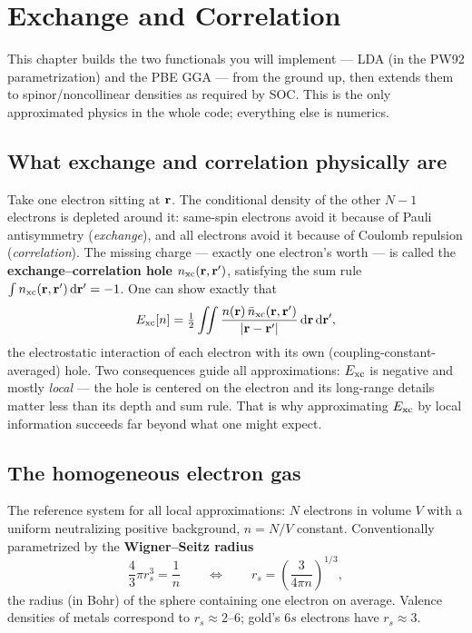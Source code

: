 \chapter{Exchange and Correlation}
\label{ch:xc}

This chapter builds the two functionals you will implement --- LDA (in the
PW92 parametrization) and the PBE GGA --- from the ground up, then extends
them to spinor/noncollinear densities as required by SOC. This is the only
approximated physics in the whole code; everything else is numerics.

\section{What exchange and correlation physically are}

Take one electron sitting at $\mathbf{r}$. The conditional density of the other
$N-1$ electrons is depleted around it: same-spin electrons avoid it because
of Pauli antisymmetry (\emph{exchange}), and all electrons avoid it because
of Coulomb repulsion (\emph{correlation}). The missing charge --- exactly one
electron's worth --- is called the \textbf{exchange--correlation hole}
$n_{\mathrm{xc}}(\mathbf{r},\mathbf{r}')$, satisfying the sum rule
$\int n_{\mathrm{xc}}(\mathbf{r},\mathbf{r}')\,\mathrm{d}\mathbf{r}' = -1$. One can show exactly that
\begin{equation}
E_{\mathrm{xc}}[n] = \tfrac12 \iint
\frac{n(\mathbf{r})\,\bar n_{\mathrm{xc}}(\mathbf{r},\mathbf{r}')}{|\mathbf{r}-\mathbf{r}'|}\,
\mathrm{d}\mathbf{r}\,\mathrm{d}\mathbf{r}' ,
\end{equation}
the electrostatic interaction of each electron with its own
(coupling-constant-averaged) hole. Two consequences guide all approximations:
$E_{\mathrm{xc}}$ is negative and mostly \emph{local} --- the hole is centered on the
electron and its long-range details matter less than its depth and sum rule.
That is why approximating $E_{\mathrm{xc}}$ by local information succeeds far beyond
what one might expect.

\section{The homogeneous electron gas}
\label{sec:heg}

The reference system for all local approximations: $N$ electrons in volume
$V$ with a uniform neutralizing positive background, $n = N/V$ constant.
Conventionally parametrized by the \textbf{Wigner--Seitz radius}
\begin{equation}
\frac{4}{3}\pi r_s^3 = \frac{1}{n}
\qquad\Longleftrightarrow\qquad
r_s = \left(\frac{3}{4\pi n}\right)^{1/3},
\end{equation}
the radius (in Bohr) of the sphere containing one electron on average.
Valence densities of metals correspond to $r_s \approx 2$--$6$; gold's $6s$
electrons have $r_s \approx 3$.

